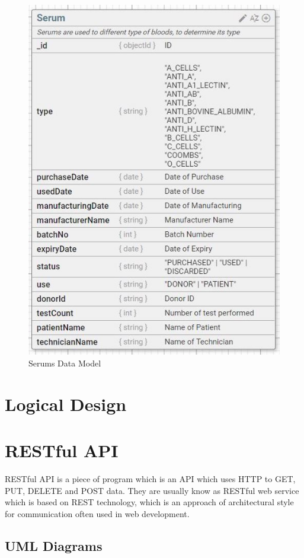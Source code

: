 \documentclass[BTech]{srmuthesis}
\begin{document}
\begin{figure}[H]
	\centering
	\includegraphics[scale=0.6]{pus_serum.jpeg}
	\caption{Serums Data Model}
\end{figure}

\section{Logical Design}
\section{RESTful API}
RESTful API is a piece of program which is an \ac{API} which uses \ac{HTTP} to GET, PUT, DELETE and POST data. They are usually know as RESTful web service which is based on \ac{REST} technology, which is an approach of architectural style for communication often used in web development.

\subsection{UML Diagrams}
\cite{uml_ref}
\end{document}
